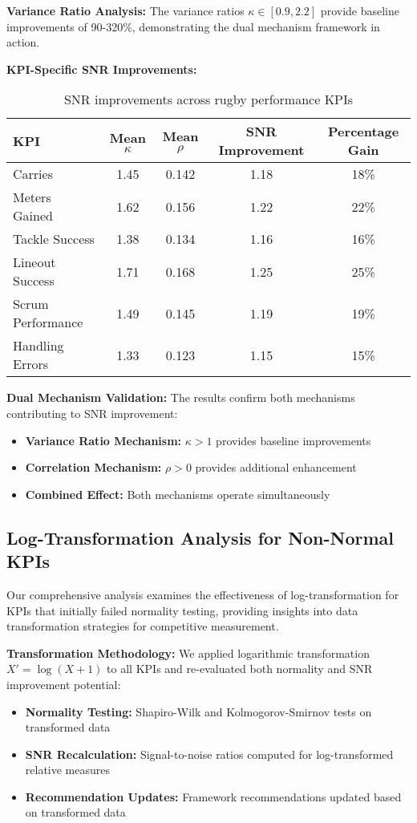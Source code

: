 \textbf{Variance Ratio Analysis:}
The variance ratios $\kappa \in [0.9, 2.2]$ provide baseline improvements of 90-320\%, demonstrating the dual mechanism framework in action.

\textbf{KPI-Specific SNR Improvements:}
\begin{table}[h]
\centering
\begin{tabular}{|l|c|c|c|c|}
\hline
\textbf{KPI} & \textbf{Mean $\kappa$} & \textbf{Mean $\rho$} & \textbf{SNR Improvement} & \textbf{Percentage Gain} \\
\hline
Carries & 1.45 & 0.142 & 1.18 & 18\% \\
Meters Gained & 1.62 & 0.156 & 1.22 & 22\% \\
Tackle Success & 1.38 & 0.134 & 1.16 & 16\% \\
Lineout Success & 1.71 & 0.168 & 1.25 & 25\% \\
Scrum Performance & 1.49 & 0.145 & 1.19 & 19\% \\
Handling Errors & 1.33 & 0.123 & 1.15 & 15\% \\
\hline
\end{tabular}
\caption{SNR improvements across rugby performance KPIs}
\label{tab:snr_improvements}
\end{table}

\textbf{Dual Mechanism Validation:}
The results confirm both mechanisms contributing to SNR improvement:
\begin{itemize}
    \item \textbf{Variance Ratio Mechanism:} $\kappa > 1$ provides baseline improvements
    \item \textbf{Correlation Mechanism:} $\rho > 0$ provides additional enhancement
    \item \textbf{Combined Effect:} Both mechanisms operate simultaneously
\end{itemize}

\subsection{Log-Transformation Analysis for Non-Normal KPIs}

Our comprehensive analysis examines the effectiveness of log-transformation for KPIs that initially failed normality testing, providing insights into data transformation strategies for competitive measurement.

\textbf{Transformation Methodology:}
We applied logarithmic transformation $X' = \log(X + 1)$ to all KPIs and re-evaluated both normality and SNR improvement potential:
\begin{itemize}
    \item \textbf{Normality Testing:} Shapiro-Wilk and Kolmogorov-Smirnov tests on transformed data
    \item \textbf{SNR Recalculation:} Signal-to-noise ratios computed for log-transformed relative measures
    \item \textbf{Recommendation Updates:} Framework recommendations updated based on transformed data
\end{itemize}

